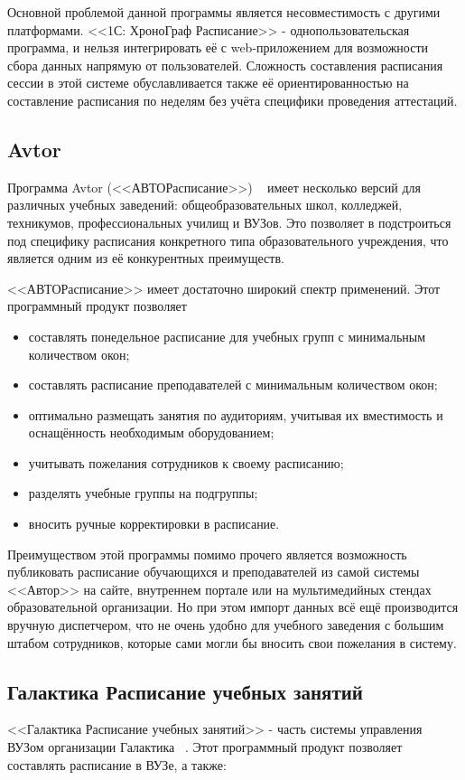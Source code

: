Основной проблемой данной программы является несовместимость с другими платформами. <<1С: ХроноГраф Расписание>> - однопользовательская программа, и нельзя интегрировать её с web-приложением для возможности сбора данных напрямую от пользователей. Сложность составления расписания сессии в этой системе обуславливается также её ориентированностью на составление расписания по неделям без учёта специфики проведения аттестаций.

\subsection{Avtor}%
Программа Avtor (<<АВТОРасписание>>) ~\cite{avtor} имеет несколько версий для различных учебных заведений: общеобразовательных школ, колледжей, техникумов, профессиональных училищ и ВУЗов. Это позволяет в подстроиться под специфику расписания конкретного типа образовательного учреждения, что является одним из её конкурентных преимуществ.

<<АВТОРасписание>> имеет достаточно широкий спектр применений. Этот программный продукт позволяет
\begin{itemize}
	\item составлять понедельное расписание для учебных групп с минимальным количеством окон;
	\item составлять расписание преподавателей с минимальным количеством окон;
	\item оптимально размещать занятия по аудиториям, учитывая их вместимость и оснащённость необходимым оборудованием;
	\item учитывать пожелания сотрудников к своему расписанию;
	\item разделять учебные группы на подгруппы;
	\item вносить ручные корректировки в расписание.
\end{itemize}

Преимуществом этой программы помимо прочего является возможность публиковать расписание обучающихся и преподавателей из самой системы <<Автор>> на сайте, внутреннем портале или на мультимедийных стендах образовательной организации. Но при этом импорт данных всё ещё производится вручную диспетчером, что не очень удобно для учебного заведения с большим штабом сотрудников, которые сами могли бы вносить свои пожелания в систему.

\subsection{Галактика Расписание учебных занятий}
<<Галактика Расписание учебных занятий>> - часть системы управления ВУЗом организации Галактика ~\cite{galaktica}. Этот программный продукт позволяет составлять расписание в ВУЗе, а также:

